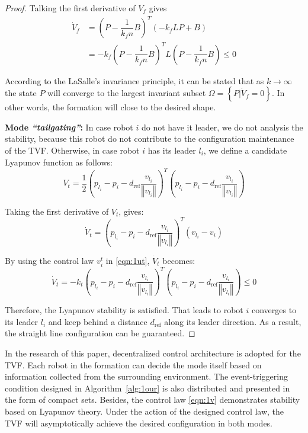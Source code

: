 \begin{proof}
Talking the first derivative of $V_f$ gives
\begin{equation}
\begin{aligned}
    \dot{V}_f&=\left(P-\dfrac{1}{k_fn}B\right)^T\left(-k_fLP+B\right)\\
    &=-k_f\left(P-\dfrac{1}{k_fn}B\right)^TL\left(P-\dfrac{1}{k_fn}B\right)\leq0
\end{aligned}
\end{equation}

According to the LaSalle’s invariance
principle, it can be stated that as $k\to\infty$ the state $P$ will converge to the largest invariant subset $\Omega=\left\{P|\dot{V}_f=0\right\}$. In other words, the formation will close to the desired shape.

\textbf{Mode \textit{``tailgating''}:} In case robot $i$ do not have it leader, we do not analysis the stability, because this robot do not contribute to the configuration maintenance of the TVF. Otherwise, in case robot $i$ has its leader $l_i$, we define a candidate Lyapunov function as follows:
\begin{equation}
    V_{t}=\dfrac{1}{2}\left(p_{l_i}-p_{i}-d_\text{ref}\dfrac{v_{l_i}}{\left\Vert v_{l_i}\right\Vert}\right)^{T}\left(p_{l_i}-p_{i}-d_\text{ref}\dfrac{v_{l_i}}{\left\Vert v_{l_i}\right\Vert}\right)
\end{equation}

Taking the first derivative of $V_t$, gives:
\begin{equation}
    \dot{V}_{t}=\left(p_{l_i}-p_{i}-d_\text{ref}\dfrac{v_{l_i}}{\left\Vert v_{l_i}\right\Vert}\right)^{T}\left(v_{l_i}-v_{i}\right)
\end{equation}

By using the control law $v^t_i$ in \eqref{eqn:1ut}, $\dot{V}_t$ becomes:
\begin{equation}
    \dot{V}_{t}=-k_{t}\left(p_{l_i}-p_{i}-d_\text{ref}\dfrac{v_{l_i}}{\left\Vert v_{l_i}\right\Vert}\right)^{T}\left(p_{l_i}-p_{i}-d_\text{ref}\dfrac{v_{l_i}}{\left\Vert v_{l_i}\right\Vert}\right)\leq0
\end{equation}

Therefore, the Lyapunov stability is satisfied. That leads to robot $i$ converges to its leader $l_i$ and keep behind a distance $d_\text{ref}$ along its leader direction. As a result, the straight line configuration can be guaranteed.
\end{proof}

\begin{remark}
In the research of this paper, decentralized control architecture is adopted for the TVF. Each robot in the formation can decide the mode itself based on information collected from the surrounding environment. The event-triggering condition designed in Algorithm~\ref{alg:1our} is also distributed and presented in the form of compact sets. Besides, the control law \eqref{eqn:1v} demonstrates stability based on Lyapunov theory. Under the action of the designed control law, the TVF will asymptotically achieve the desired configuration in both modes.
\end{remark}